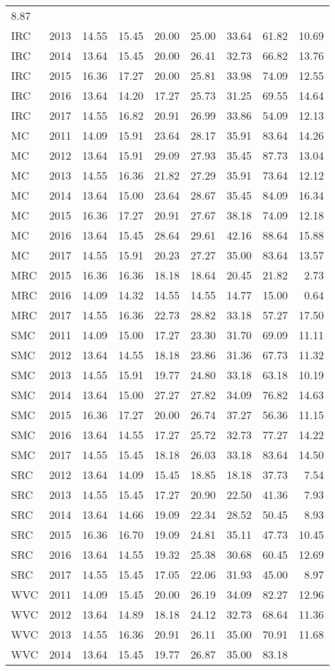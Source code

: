 \documentclass[]{article}
\begin{document}
\begin{longtable}[]{@{}lrrrrrrrr@{}}
8.87\tabularnewline
IRC & 2013 & 14.55 & 15.45 & 20.00 & 25.00 & 33.64 & 61.82 &
10.69\tabularnewline
IRC & 2014 & 13.64 & 15.45 & 20.00 & 26.41 & 32.73 & 66.82 &
13.76\tabularnewline
IRC & 2015 & 16.36 & 17.27 & 20.00 & 25.81 & 33.98 & 74.09 &
12.55\tabularnewline
IRC & 2016 & 13.64 & 14.20 & 17.27 & 25.73 & 31.25 & 69.55 &
14.64\tabularnewline
IRC & 2017 & 14.55 & 16.82 & 20.91 & 26.99 & 33.86 & 54.09 &
12.13\tabularnewline
MC & 2011 & 14.09 & 15.91 & 23.64 & 28.17 & 35.91 & 83.64 &
14.26\tabularnewline
MC & 2012 & 13.64 & 15.91 & 29.09 & 27.93 & 35.45 & 87.73 &
13.04\tabularnewline
MC & 2013 & 14.55 & 16.36 & 21.82 & 27.29 & 35.91 & 73.64 &
12.12\tabularnewline
MC & 2014 & 13.64 & 15.00 & 23.64 & 28.67 & 35.45 & 84.09 &
16.34\tabularnewline
MC & 2015 & 16.36 & 17.27 & 20.91 & 27.67 & 38.18 & 74.09 &
12.18\tabularnewline
MC & 2016 & 13.64 & 15.45 & 28.64 & 29.61 & 42.16 & 88.64 &
15.88\tabularnewline
MC & 2017 & 14.55 & 15.91 & 20.23 & 27.27 & 35.00 & 83.64 &
13.57\tabularnewline
MRC & 2015 & 16.36 & 16.36 & 18.18 & 18.64 & 20.45 & 21.82 &
2.73\tabularnewline
MRC & 2016 & 14.09 & 14.32 & 14.55 & 14.55 & 14.77 & 15.00 &
0.64\tabularnewline
MRC & 2017 & 14.55 & 16.36 & 22.73 & 28.82 & 33.18 & 57.27 &
17.50\tabularnewline
SMC & 2011 & 14.09 & 15.00 & 17.27 & 23.30 & 31.70 & 69.09 &
11.11\tabularnewline
SMC & 2012 & 13.64 & 14.55 & 18.18 & 23.86 & 31.36 & 67.73 &
11.32\tabularnewline
SMC & 2013 & 14.55 & 15.91 & 19.77 & 24.80 & 33.18 & 63.18 &
10.19\tabularnewline
SMC & 2014 & 13.64 & 15.00 & 27.27 & 27.82 & 34.09 & 76.82 &
14.63\tabularnewline
SMC & 2015 & 16.36 & 17.27 & 20.00 & 26.74 & 37.27 & 56.36 &
11.15\tabularnewline
SMC & 2016 & 13.64 & 14.55 & 17.27 & 25.72 & 32.73 & 77.27 &
14.22\tabularnewline
SMC & 2017 & 14.55 & 15.45 & 18.18 & 26.03 & 33.18 & 83.64 &
14.50\tabularnewline
SRC & 2012 & 13.64 & 14.09 & 15.45 & 18.85 & 18.18 & 37.73 &
7.54\tabularnewline
SRC & 2013 & 14.55 & 15.45 & 17.27 & 20.90 & 22.50 & 41.36 &
7.93\tabularnewline
SRC & 2014 & 13.64 & 14.66 & 19.09 & 22.34 & 28.52 & 50.45 &
8.93\tabularnewline
SRC & 2015 & 16.36 & 16.70 & 19.09 & 24.81 & 35.11 & 47.73 &
10.45\tabularnewline
SRC & 2016 & 13.64 & 14.55 & 19.32 & 25.38 & 30.68 & 60.45 &
12.69\tabularnewline
SRC & 2017 & 14.55 & 15.45 & 17.05 & 22.06 & 31.93 & 45.00 &
8.97\tabularnewline
WVC & 2011 & 14.09 & 15.45 & 20.00 & 26.19 & 34.09 & 82.27 &
12.96\tabularnewline
WVC & 2012 & 13.64 & 14.89 & 18.18 & 24.12 & 32.73 & 68.64 &
11.36\tabularnewline
WVC & 2013 & 14.55 & 16.36 & 20.91 & 26.11 & 35.00 & 70.91 &
11.68\tabularnewline
WVC & 2014 & 13.64 & 15.45 & 19.77 & 26.87 & 35.00 & 83.18 &

\end{longtable}
\end{document}

